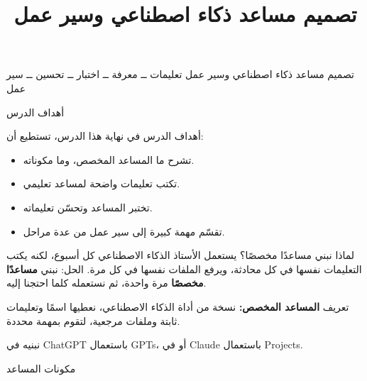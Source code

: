 \documentclass[aspectratio=169, 11pt, xcolor={table}]{beamer}
\title{تصميم مساعد ذكاء اصطناعي وسير عمل}
\begin{document}
{تصميم مساعد ذكاء اصطناعي وسير عمل}
{تعليمات ــ معرفة ــ اختبار ــ تحسين ــ سير عمل}

\begin{frame}{أهداف الدرس}
    \begin{tbox}{\faBullseye\quad أهداف الدرس}
        في نهاية هذا الدرس، تستطيع أن:
        \begin{itemize}
            \item تشرح ما المساعد المخصص، وما مكوناته.
            \item تكتب تعليمات واضحة لمساعد تعليمي.
            \item تختبر المساعد وتحسّن تعليماته.
            \item تقسّم مهمة كبيرة إلى سير عمل من عدة مراحل.
        \end{itemize}
    \end{tbox}
\end{frame}

\begin{frame}{لماذا نبني مساعدًا مخصصًا؟}
    يستعمل الأستاذ الذكاء الاصطناعي كل أسبوع، لكنه يكتب التعليمات نفسها في كل محادثة،
    ويرفع الملفات نفسها في كل مرة.
    الحل: نبني \textbf{مساعدًا مخصصًا} مرة واحدة، ثم نستعمله كلما احتجنا إليه.
    \begin{tbox}{\faLightbulb\quad تعريف}
        \textbf{المساعد المخصص:} نسخة من أداة الذكاء الاصطناعي،
        نعطيها اسمًا وتعليمات ثابتة وملفات مرجعية، لتقوم بمهمة محددة.
    \end{tbox}
    نبنيه في \textenglish{ChatGPT} باستعمال \textenglish{GPTs}،
    أو في \textenglish{Claude} باستعمال \textenglish{Projects}.
\end{frame}

\begin{frame}{مكونات المساعد}
    \begin{center}
    \end{center}
\end{frame}
\end{document}
